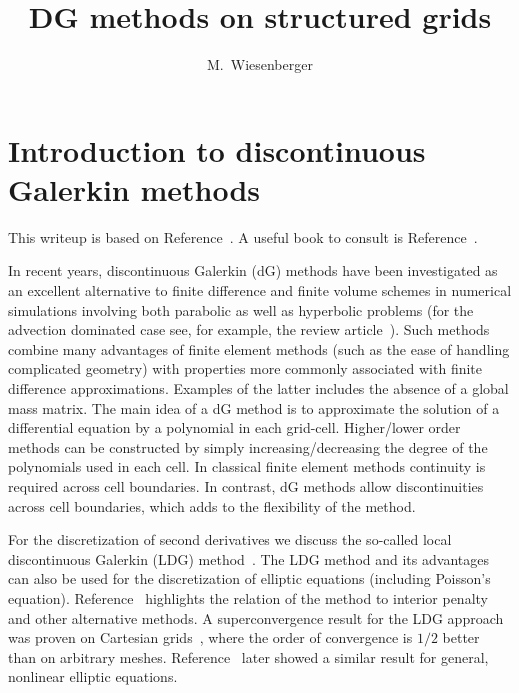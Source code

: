 




\title{DG methods on structured grids}
\author{M.~Wiesenberger}
\tableofcontents

\section{ Introduction to discontinuous Galerkin methods} \label{sec:discretization}
This writeup is based on Reference~\cite{WiesenbergerPhD}. A useful book to consult
is Reference~\cite{NodalDG}.

In recent years, discontinuous Galerkin (dG) methods have been investigated 
as an excellent alternative to finite difference and finite volume schemes 
in numerical simulations involving both parabolic as well as hyperbolic problems 
(for the advection dominated case see, for example, the review article~\cite{Cockburn2001runge}). 
Such methods combine many advantages of finite element methods (such as the ease of handling 
complicated geometry) with properties more commonly associated with 
finite difference approximations. Examples of the latter includes the absence 
of a global mass matrix. 
The main idea of a dG method is to approximate the solution 
of a differential equation by a polynomial in each grid-cell. 
Higher/lower
order methods can be constructed by simply increasing/decreasing the degree of 
the polynomials used in each cell. 
In classical finite element methods continuity is required across cell boundaries. 
In contrast, dG methods allow discontinuities across cell boundaries, which adds to the flexibility of the method.

For the discretization of second derivatives we discuss the so-called local discontinuous Galerkin (LDG) method~\cite{Cockburn1998}.
The LDG method and its advantages can also be used for the discretization of 
elliptic equations (including Poisson's equation). 
Reference~\cite{Arnold2002} highlights the relation 
of the method to interior penalty and other alternative methods. 
A superconvergence result for the 
LDG approach was proven on Cartesian grids~\cite{Cockburn2002},
where the order of convergence is $1/2$ better than on arbitrary meshes.
Reference~\cite{Yadav2013} later showed a similar result for general, nonlinear elliptic equations.

